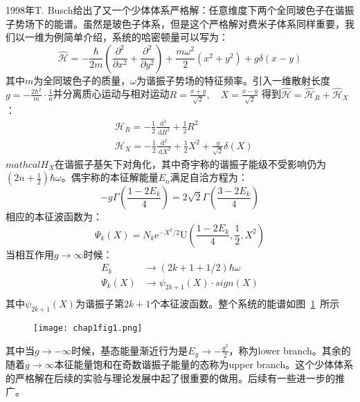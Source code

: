 1998年T. Busch给出了又一个少体体系严格解：任意维度下两个全同玻色子在谐振子势场下的能谱。虽然是玻色子体系，但是这个严格解对费米子体系同样重要，我们以一维为例简单介绍，系统的哈密顿量可以写为：
\begin{equation}
\hat{\mathcal{H}}=-\frac{\hbar}{2 m}\left(\frac{\partial^{2}}{\partial x^{2}}+\frac{\partial^{2}}{\partial y^{2}}\right)+\frac{m \omega^{2}}{2}\left(x^{2}+y^{2}\right)+g \delta(x-y)
\end{equation}
其中$m$为全同玻色子的质量，$\omega$为谐振子势场的特征频率。引入一维散射长度$g= -\frac{2\hbar^2}{m}\cdot\frac{1}{a}$并分离质心运动与相对运动$R = \frac{x+y}{\sqrt{2}}, \quad X = \frac{x-y}{\sqrt{2}}$
得到$\hat{\mathcal{H} } = \hat{\mathcal{H}}_R+ \hat{\mathcal{H}}_X$：
\begin{equation}
\begin{aligned}
&\mathcal{H}_{R}=-\frac{1}{2} \frac{\mathrm{d}^{2}}{\mathrm{~d} R^{2}}+\frac{1}{2} R^{2} \\
&\mathcal{H}_{X}=-\frac{1}{2} \frac{\mathrm{d}^{2}}{\mathrm{~d} X^{2}}+\frac{1}{2} X^{2}+\frac{g}{\sqrt{2}} \delta(X)
\end{aligned}
\end{equation}
$mathcal{H}_{X}$在谐振子基矢下对角化，其中奇宇称的谐振子能级不受影响仍为$(2n+\frac{1}{2})\hbar\omega$。偶宇称的本征解能量$E_n$满足自洽方程为：
\begin{equation}
	-g \Gamma\left(\frac{1-2 E_{k}}{4}\right)=2 \sqrt{2} \Gamma\left(\frac{3-2 E_{k}}{4}\right)
\end{equation}
相应的本征波函数为：
\begin{equation}
	\Psi_{k}(X)=N_{k} \mathrm{e}^{-X^{2} / 2} \mathrm{U}\left(\frac{1-2 E_{k}}{4}, \frac{1}{2}, X^{2}\right)
\end{equation}
当相互作用$g\to\infty$时候：
\begin{equation}
\begin{split}
	E_k &\to (2k+1+1/2)\hbar\omega\\
	\Psi_{k}(X) &\to \psi_{2k+1}(X)\cdot sign(X)\\
\end{split}
\end{equation}
其中$\psi_{2k+1}(X)$为谐振子第$2k+1$个本征波函数。整个系统的能谱如图~\ref{chap1fig1}~所示
\begin{figure}[!htbp]
    \centering
    \texttt{[image: chap1fig1.png]}
    \label{chap1fig1}
\end{figure}
其中当$g\to-\infty$时候，基态能量渐近行为是$E_g\to-\frac{g^2}{2}$，称为lower branch。其余的随着$g\to\infty$本征能量饱和在奇数谐振子能量的态称为upper branch。这个少体体系的严格解在后续的实验与理论发展中起了很重要的做用。{\color{red}后续有一些进一步的推广。}

